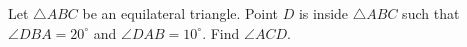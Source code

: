 Let $\triangle ABC$ be an equilateral triangle. Point $D$ is inside $\triangle ABC$ such that $\angle DBA=20^\circ$ and $\angle DAB=10^\circ$. Find $\angle ACD$.
